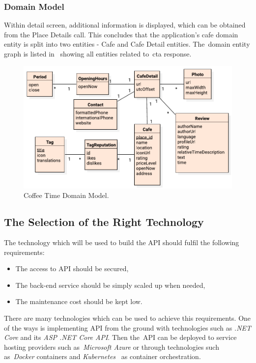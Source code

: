 \subsubsection{Domain Model}
Within detail screen, additional information is displayed, which can be obtained from the Place Details call. This concludes that the application's cafe domain entity is split into two entities - Cafe and Cafe Detail entities. The~domain entity graph is listed in~ showing all entities related to~\gls{cta} response.

\begin{figure}[ht]
    \centering
    \includegraphics[width=0.9\linewidth]{img/analysis/domain.pdf}
    \caption{Coffee Time Domain Model.}
    \label{fig:domain}
\end{figure}

\subsection{The Selection of the Right Technology}
The technology which will be used to build the API should fulfil the following requirements:

\begin{itemize}
    \item The access to API should be secured,
    \item The back-end service should be simply scaled up when needed,
    \item The maintenance cost should be kept low.
\end{itemize}

There are many technologies which can be used to achieve this requirements. One of the ways is implementing API from the ground with technologies such as \textit{.NET Core} and its \textit{ASP .NET Core API}. Then the~API can be deployed to service hosting providers such as~\textit{Microsoft Azure} or through technologies such as~\textit{Docker} containers and \textit{Kubernetes}~\cite{kubernetes} as container orchestration. 

